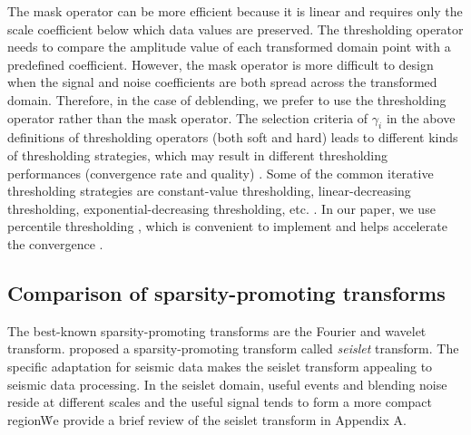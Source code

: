 

The mask operator can be more efficient because it is linear and requires only the scale coefficient below which data values are preserved. The thresholding operator needs to compare the amplitude value of each transformed domain point with a predefined coefficient. However, the mask operator is more difficult to design when the signal and noise coefficients are both spread across the transformed domain. Therefore, in the case of deblending, we prefer to use the thresholding operator rather than the mask operator. The selection criteria of $\gamma_i$ in the above definitions of thresholding operators (both soft and hard) leads to different kinds of thresholding strategies, which may result in different thresholding performances (convergence rate and quality) \cite[]{pengliang2013}. Some of the common iterative thresholding strategies are constant-value thresholding, linear-decreasing thresholding, exponential-decreasing thresholding, etc. \cite[]{jianjun2010}.  In our paper, we use percentile thresholding \cite[]{dian2008,pengliang20121}, which is convenient to implement and helps accelerate the convergence \cite[]{pengliang20121}. %

\subsection{Comparison of sparsity-promoting transforms}
The best-known sparsity-promoting transforms are the Fourier %
and wavelet transform. 
\cite{seislet} proposed a sparsity-promoting transform called \emph{seislet} transform. The specific adaptation for seismic data makes the seislet transform appealing to seismic data processing. In the seislet domain, useful events and blending noise reside at different scales and the useful signal tends to form a more compact region\. We provide a brief review of the seislet transform in Appendix A.


